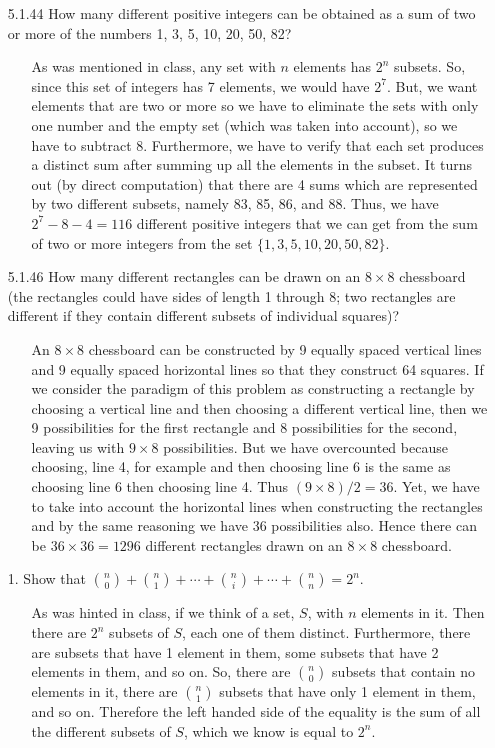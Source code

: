 \documentclass[12pt]{article}
\begin{document}
\begin{enumerate}
\item[5.1.44] How many different positive integers can be obtained as a sum of two or more of the numbers 1, 3, 5, 10, 20, 50, 82?
\begin{enumerate}
\item[] As was mentioned in class, any set with $n$ elements has $2^n$ subsets. So, since this set of integers
has 7 elements, we would have $2^7$. But, we want elements that are two or more so we have to eliminate the 
sets with only one number and the empty set (which was taken into account), so we have to subtract 8. Furthermore,
we have to verify that each set produces a distinct sum after summing up all the elements in the subset. It 
turns out (by direct computation) that there are 4 sums which are represented by two different subsets, namely
83, 85, 86, and 88. Thus, we have $2^7 - 8 - 4 = 116$ different positive integers that we can get from the sum
of two or more integers from the set $\{1, 3, 5, 10, 20, 50, 82 \}$.
\end{enumerate}

\item[5.1.46] How many different rectangles can be drawn on an $8 \times 8$ chessboard (the rectangles could have sides of length 1 through 8; two rectangles are different if they contain different subsets of individual squares)?
\begin{enumerate}
\item[] An $8 \times 8$ chessboard can be constructed by 9 equally spaced vertical lines and 9 equally
spaced horizontal lines so that they construct 64 squares. If we consider the paradigm of this problem as
constructing a rectangle by choosing a vertical line and then choosing a different vertical line, then we
9 possibilities for the first rectangle and 8 possibilities for the second, leaving us with $9 \times 8$ 
possibilities. But we have overcounted because choosing, line 4, for example and then choosing line 6 is
the same as choosing line 6 then choosing line 4. Thus $(9 \times 8)/2 = 36$. Yet, we have to take into
account the horizontal lines when constructing the rectangles and by the same reasoning we have 36 
possibilities also. Hence there can be $36 \times 36 = 1296$ different rectangles drawn on an $8 \times 8$
chessboard.
\end{enumerate}


\item[1.] Show that ${n \choose 0} + {n \choose 1} + \cdots + {n \choose i} + \cdots + {n \choose n} = 2^n$.
\begin{enumerate}
\item[] As was hinted in class, if we think of a set, $S$, with $n$ elements in it. Then there are $2^n$ subsets of
$S$, each one of them distinct. Furthermore, there are subsets that have 1 element in them, some subsets that
have 2 elements in them, and so on. So, there are ${n \choose 0}$ subsets that contain no elements in it, there
are ${n \choose 1}$ subsets that have only 1 element in them, and so on. Therefore the left handed side of the 
equality is the sum of all the different subsets of $S$, which we know is equal to $2^n$.
\end{enumerate}



\end{enumerate}
\end{document}
